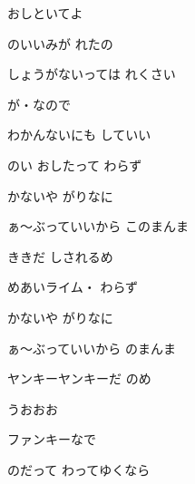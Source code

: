\documentclass[a4paper,tate,twocolumn,12pt]{ltjtarticle}
\begin{document}
\thispagestyle{empty}

\begin{center}
{\LARGE おしといてよ}
\end{center}

\vspace{1em}

\begin{flushleft}

\noindent\begin{minipage}{\linewidth}
のいいみが れたの

しょうがないっては れくさい

が・なので

わかんないにも していい
\end{minipage}

\vspace{2em}

\noindent\begin{minipage}{\linewidth}
のい おしたって わらず

かないや がりなに

ぁ～ぶっていいから このまんま

ききだ しされるめ

めあいライム・ わらず

かないや がりなに

ぁ～ぶっていいから のまんま

ヤンキーヤンキーだ のめ

うおおお
\end{minipage}

\vspace{2em}

\noindent\begin{minipage}{\linewidth}
ファンキーなで

のだって わってゆくなら


\end{minipage}
\end{flushleft}
\end{document}
